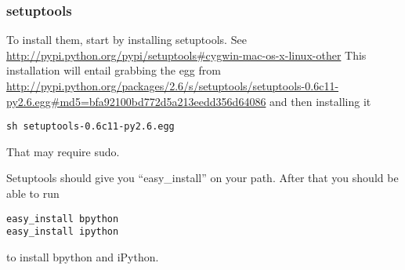 \begin{enumerate}
\subsubsection*{setuptools}
To install them, start by installing setuptools.  See \url{http://pypi.python.org/pypi/setuptools#cygwin-mac-os-x-linux-other}
This installation  will entail  grabbing the egg from \url{http://pypi.python.org/packages/2.6/s/setuptools/setuptools-0.6c11-py2.6.egg#md5=bfa92100bd772d5a213eedd356d64086}
and then installing it 
\begin{verbatim}
sh setuptools-0.6c11-py2.6.egg
\end{verbatim}
That may require sudo.

Setuptools should give you ``easy\_install'' on your path.
After that you should be able to run
\begin{verbatim}
easy_install bpython
easy_install ipython
\end{verbatim}
to install bpython and iPython.




\end{enumerate}
